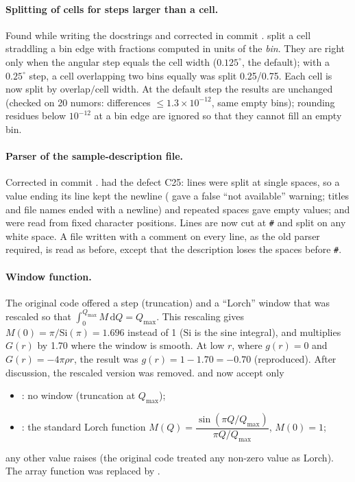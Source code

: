 \documentclass[11pt,a4paper]{article}
\begin{document}
\paragraph{\fixed{} Splitting of cells for steps larger than a cell.} \newbeh{}
Found while writing the docstrings and corrected in commit .
 split a cell straddling a bin edge with fractions computed in
units of the \emph{bin}. They are right only when the angular step equals
the cell width ($0.125^\circ$, the default); with a $0.25^\circ$ step, a cell
overlapping two bins equally was split 0.25/0.75. Each cell is now split by
overlap$/$cell width. At the default step the results are unchanged
(checked on 20 numors: differences $\le 1.3\times10^{-12}$, same empty
bins); rounding residues below $10^{-12}$ at a bin edge are ignored so that
they cannot fill an empty bin.

\paragraph{\fixed{} Parser of the sample-description file.} Corrected in
commit .  had the defect C25: lines
were split at single spaces, so a value ending its line kept the newline
( gave a false ``not available'' warning; titles and file
names ended with a newline) and repeated spaces gave empty values;
 and  were read from fixed character
positions. Lines are now cut at \texttt{\#} and split on any white space. A
file written with a comment on every line, as the old parser required,
is read as before, except that the description loses the spaces before
\texttt{\#}.

\label{sec:fourier}

\paragraph{ Window function.} \newbeh{}
The original code offered a step (truncation) and a ``Lorch'' window that
was rescaled so that $\int_0^{Q_\mathrm{max}} M\,\mathrm{d}Q = Q_\mathrm{max}$.
This rescaling gives $M(0) = \pi/\mathrm{Si}(\pi) = 1.696$ instead of 1
($\mathrm{Si}$ is the sine integral), and multiplies $G(r)$ by 1.70 where
the window is smooth. At low $r$, where $g(r)=0$ and $G(r)=-4\pi\rho r$,
the result was $g(r) = 1 - 1.70 = -0.70$ (reproduced). After discussion, the
rescaled version was removed.  and
 now accept only
\begin{itemize}
  \item {}: no window (truncation at $Q_\mathrm{max}$);
  \item {}: the standard Lorch function
    $M(Q) = \dfrac{\sin(\pi Q/Q_\mathrm{max})}{\pi Q/Q_\mathrm{max}}$, $M(0)=1$;
\end{itemize}
any other value raises  (the original code treated any
non-zero value as Lorch). The array function  was replaced by
.
\end{document}
